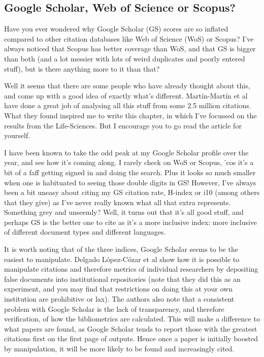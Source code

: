\documentclass[
]{krantz}
\begin{document}
\hypertarget{google-scholar-web-of-science-or-scopus}{%
\subsection{Google Scholar, Web of Science or Scopus?}\label{google-scholar-web-of-science-or-scopus}}

Have you ever wondered why Google Scholar (GS) scores are so inflated compared to other citation databases like Web of Science (WoS) or Scopus? I've always noticed that Scopus has better coverage than WoS, and that GS is bigger than both (and a lot messier with lots of weird duplicates and poorly entered stuff), but is there anything more to it than that?

Well it seems that there are some people who have already thought about this, and come up with a good idea of exactly what's different. Martín-Martín et al \citeyearpar{martin-martin2018google} have done a great job of analysing all this stuff from some 2.5 million citations. What they found inspired me to write this chapter, in which I've focussed on the results from the Life-Sciences. But I encourage you to go read the article for yourself.

I have been known to take the odd peak at my Google Scholar profile over the year, and see how it's coming along. I rarely check on WoS or Scopus, 'cos it's a bit of a faff getting signed in and doing the search. Plus it looks so much smaller when one is habituated to seeing those double digits in GS! However, I've always been a bit uneasy about citing my GS citation rate, H-index or i10 (among others that they give) as I've never really known what all that extra represents. Something grey and unseemly? Well, it turns out that it's all good stuff, and perhaps GS is the better one to cite as it's a more inclusive index: more inclusive of different document types and different languages.

It is worth noting that of the three indices, Google Scholar seems to be the easiest to manipulate. Delgado López‐Cózar et al \citeyearpar{delgadolopez-cozar2014google} show how it is possible to manipulate citations and therefore metrics of individual researchers by depositing false documents into institutional repositories (note that they did this as an experiment, and you may find that restrictions on doing this at your own institution are prohibitive or lax). The authors also note that a consistent problem with Google Scholar is the lack of transparency, and therefore verification, of how the bibliometrics are calculated. This will make a difference to what papers are found, as Google Scholar tends to report those with the greatest citations first on the first page of outputs. Hence once a paper is initially boosted by manipulation, it will be more likely to be found and increasingly cited.
\end{document}
